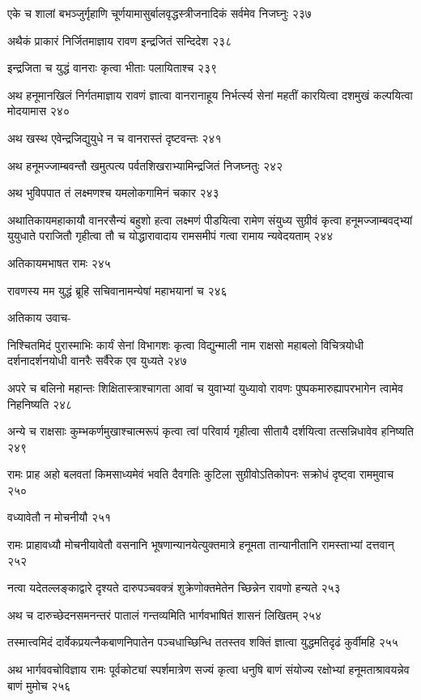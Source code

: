 एके च शालां बभञ्जुर्गृहाणि चूर्णयामासुर्बालवृद्धस्त्रीजनादिकं सर्वमेव निजघ्नुः २३७

अथैकं प्राकारं निर्जितमाज्ञाय रावण इन्द्रजितं सन्दिदेश २३८

इन्द्रजिता च युद्धं वानराः कृत्वा भीताः पलायिताश्च २३९

अथ हनूमानखिलं निर्गतमाज्ञाय रावणं ज्ञात्वा वानरानाहूय निर्भर्त्स्य सेनां महतीं कारयित्वा
दशमुखं कल्पयित्वा मोदयामास २४०

अथ खस्थ एवेन्द्रजिद्युयुधे न च वानरास्तं दृष्टवन्तः २४१

अथ हनूमज्जाम्बवन्तौ खमुत्पत्य पर्वतशिखराभ्यामिन्द्रजितं निजघ्नतुः २४२

अथ भुविपपात तं लक्ष्मणश्च यमलोकगामिनं चकार २४३

अथातिकायमहाकायौ वानरसैन्यं बहुशो हत्वा लक्ष्मणं पीडयित्वा रामेण संयुध्य सुग्रीवं कृत्वा
हनूमज्जाम्बवद्भ्यां युयुधाते पराजितौ गृहीत्वा तौ च योद्धारावादाय रामसमीपं गत्वा रामाय
न्यवेदयताम् २४४

अतिकायमभाषत रामः २४५

रावणस्य मम युद्धं ब्रूहि सचिवानामन्येषां महाभयानां च २४६

अतिकाय उवाच-

निश्चितमिदं पुरास्माभिः कार्यं सेनां विभागशः कृत्वा विद्युन्माली नाम राक्षसो महाबलो
विचित्रयोधी दर्शनादर्शनयोधी वानरैः सर्वैरेक एव युध्यते २४७

अपरे च बलिनो महान्तः शिक्षितास्त्राश्चागता आवां च युवाभ्यां युध्यावो रावणः
पुष्पकमारुह्यापरभागेन त्वामेव निहनिष्यति २४८

अन्ये च राक्षसाः कुम्भकर्णमुखाश्चात्मरूपं कृत्वा त्वां परिवार्य गृहीत्वा सीतायै दर्शयित्वा
तत्सन्निधावेव हनिष्यति २४९

रामः प्राह अहो बलवतां किमसाध्यमेवं भवति दैवगतिः कुटिला सुग्रीवोऽतिकोपनः सक्रोधं
दृष्ट्वा राममुवाच २५०

वध्यावेतौ न मोचनीयौ २५१

रामः प्राहावध्यौ मोचनीयावेतौ वसनानि भूषणान्यानयेत्युक्तमात्रे हनूमता तान्यानीतानि
रामस्ताभ्यां दत्तवान् २५२

नत्वा यदेतल्लङ्काद्वारे दृश्यते दारुपञ्चवक्त्रं शुक्रेणोक्तमेतेन च्छिन्नेन रावणो हन्यते २५३

अथ च दारुच्छेदनसमनन्तरं पातालं गन्तव्यमिति भार्गवभाषितं शासनं लिखितम् २५४

तस्मात्त्वमिदं दार्वेकप्रयत्नैकबाणनिपातेन पञ्चधाच्छिन्धि ततस्तव शक्तिं ज्ञात्वा युद्धमतिदृढं
कुर्वीमहि २५५

अथ भार्गववचोविज्ञाय रामः पूर्वकोट्यां स्पर्शमात्रेण सज्यं कृत्वा धनुषि बाणं संयोज्य
रक्षोभ्यां हनूमताश्रावयन्नेव बाणं मुमोच २५६

